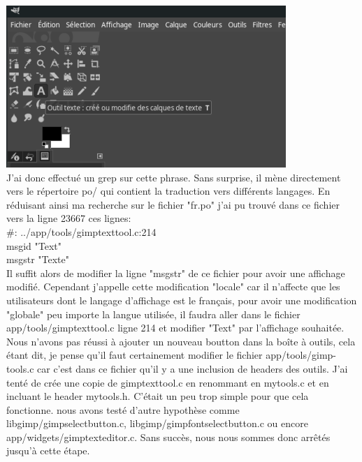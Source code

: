 \documentclass[12pt, letterpaper]{article}
\begin{document}
\includegraphics[width=\linewidth]{c2.png}\\
J'ai donc effectué un grep sur cette phrase. Sans surprise, il mène directement vers le répertoire po/ qui contient la traduction vers différents langages. En réduisant ainsi ma recherche sur le fichier "fr.po" j'ai pu trouvé dans ce fichier vers la ligne 23667 ces lignes: \\
\#: ../app/tools/gimptexttool.c:214\\
msgid "Text"\\
msgstr "Texte"\\
Il suffit alors de modifier la ligne "msgstr" de ce fichier pour avoir une affichage modifié. Cependant j'appelle cette modification "locale" car il n'affecte que les utilisateurs dont le langage d'affichage est le français, pour avoir une modification "globale" peu importe la langue utilisée, il faudra aller dans le fichier app/tools/gimptexttool.c ligne 214 et modifier "Text" par l'affichage souhaitée.\\
Nous n'avons pas réussi à ajouter un nouveau boutton dans la boîte à outils, cela étant dit, je pense qu'il faut certainement modifier le fichier app/tools/gimp-tools.c car c'est dans ce fichier qu'il y a une inclusion de headers des outils. J'ai tenté de crée une copie de gimptexttool.c en renommant en mytools.c et en incluant le header mytools.h. C'était un peu trop simple pour que cela fonctionne. nous avons testé d'autre hypothèse comme libgimp/gimpselectbutton.c, libgimp/gimpfontselectbutton.c ou encore \\app/widgets/gimptexteditor.c.
Sans succès, nous nous sommes donc arrêtés jusqu'à cette étape.
\end{document}
